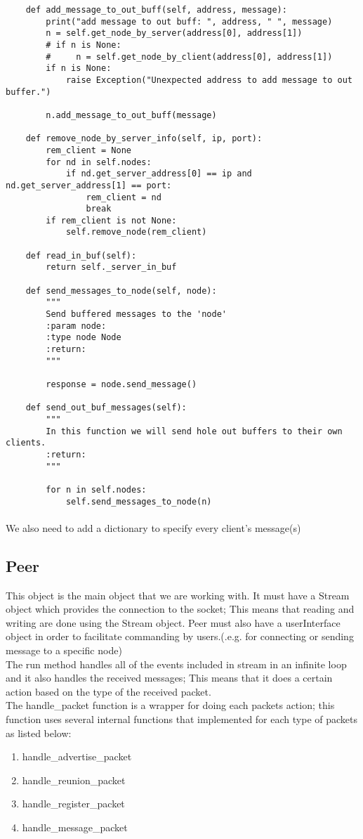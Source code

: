 \documentclass{article}
\begin{document}
\begin{lstlisting}
    def add_message_to_out_buff(self, address, message):
        print("add message to out buff: ", address, " ", message)
        n = self.get_node_by_server(address[0], address[1])
        # if n is None:
        #     n = self.get_node_by_client(address[0], address[1])
        if n is None:
            raise Exception("Unexpected address to add message to out buffer.")

        n.add_message_to_out_buff(message)

    def remove_node_by_server_info(self, ip, port):
        rem_client = None
        for nd in self.nodes:
            if nd.get_server_address[0] == ip and nd.get_server_address[1] == port:
                rem_client = nd
                break
        if rem_client is not None:
            self.remove_node(rem_client)

    def read_in_buf(self):
        return self._server_in_buf

    def send_messages_to_node(self, node):
        """
        Send buffered messages to the 'node'
        :param node:
        :type node Node
        :return:
        """

        response = node.send_message()

    def send_out_buf_messages(self):
        """
        In this function we will send hole out buffers to their own clients.
        :return:
        """

        for n in self.nodes:
            self.send_messages_to_node(n)
\end{lstlisting}
\paragraph{}We also need to add a dictionary to specify every client's message(s)
\subsection{Peer}This object is the main object that we are working with. It must have a Stream object which provides the connection to the socket; This means that reading and writing are done using the Stream object. Peer must also have a userInterface object in order to facilitate commanding by users.(.e.g. for connecting or sending message to a specific node)\\
The run method handles all of the events included in stream in an infinite loop and it also handles the received messages; This means that it does a certain action based on the type of the received packet.
\\
The handle\_packet function is a wrapper for doing each packets action; this function uses several internal functions that implemented for each type of packets as listed below:
\\
\begin{enumerate}
  \item handle\_advertise\_packet
  \item handle\_reunion\_packet
  \item handle\_register\_packet
  \item handle\_message\_packet
\end{enumerate}
\end{document}
